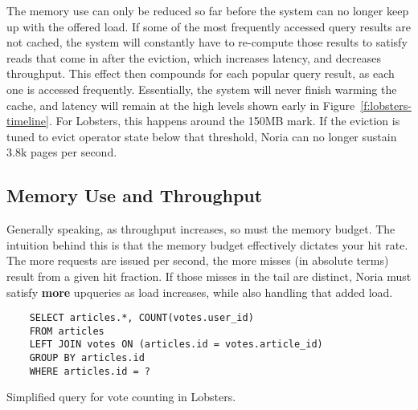 %

The memory use can only be reduced so far before the system can no longer keep
up with the offered load. If some of the most frequently accessed query results
are not cached, the system will constantly have to re-compute those results to
satisfy reads that come in after the eviction, which increases latency, and
decreases throughput. This effect then compounds for each popular query result,
as each one is accessed frequently. Essentially, the system will never finish
warming the cache, and latency will remain at the high levels shown early in
Figure~\ref{f:lobsters-timeline}. For Lobsters, this happens around the 150MB
mark. If the eviction is tuned to evict operator state below that threshold,
Noria can no longer sustain 3.8k pages per second.

\subsection{Memory Use and Throughput}

Generally speaking, as throughput increases, so must the memory budget. The
intuition behind this is that the memory budget effectively dictates your hit
rate. The more requests are issued per second, the more misses (in absolute
terms) result from a given hit fraction. If those misses in the tail are
distinct, Noria must satisfy \textbf{more} upqueries as load increases, while
also handling that added load.

\begin{listing}[h]
  \begin{verbatim}
    SELECT articles.*, COUNT(votes.user_id)
    FROM articles
    LEFT JOIN votes ON (articles.id = votes.article_id)
    GROUP BY articles.id
    WHERE articles.id = ?
  \end{verbatim}
  \caption{Simplified query for vote counting in Lobsters.}
  \label{l:votes}
\end{listing}

